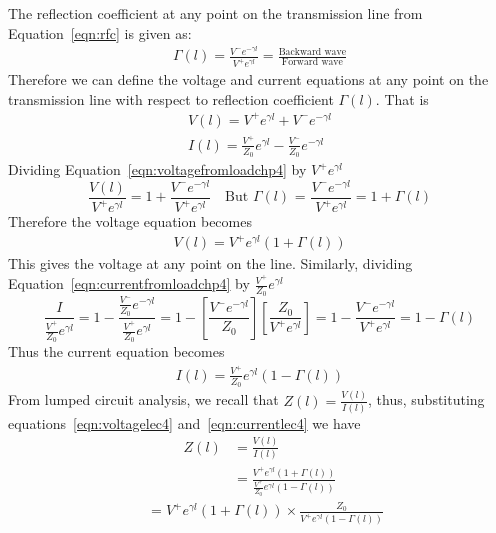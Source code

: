 The reflection coefficient at any point on the transmission line from Equation~\eqref{eqn:rfc} is given as:
\begin{align*}
\Gamma{(l)} = \frac{V^-e^{-\gamma l}}{V^+e^{\gamma l}} = \frac{\text{Backward wave}}{\text{Forward wave}}
\end{align*}
Therefore we can define the voltage and current equations at any point on the transmission line with respect to reflection coefficient $\Gamma(l)$. That is
\begin{align}
V(l) = V^+e^{\gamma l} + V^-e^{-\gamma l}\label{eqn:voltagefromloadchp4}\\
I(l) =\frac{V^+}{Z_0} e^{\gamma l} - \frac{V^-}{Z_0}e^{-\gamma l}\label{eqn:currentfromloadchp4}
\end{align}
Dividing Equation~\ref{eqn:voltagefromloadchp4} by $V^+e^{\gamma l}$
\begin{dmath*}
\frac{V(l)}{ V^+e^{\gamma l}} = 1 + \frac{ V^-e^{-\gamma l}}{ V^+e^{\gamma l}}\quad\text{But }\Gamma(l)\text{ = }\frac{ V^-e^{-\gamma l}}{ V^+e^{\gamma l}}
= 1 + \Gamma(l)
\end{dmath*}
Therefore the voltage equation becomes
\begin{align}
V(l) = V^+e^{\gamma l} (1 + \Gamma(l))
\label{eqn:voltagelec4}
\end{align}
This gives the voltage at any point on the line. Similarly, dividing Equation~\ref{eqn:currentfromloadchp4} by $\frac{V^+}{Z_0} e^{\gamma l}$
\begin{dmath*}
\frac{I}{\frac{V^+}{Z_0} e^{\gamma l}} = 1 - \frac{\frac{V^-}{Z_0} e^{-\gamma l}}{\frac{V^+}{Z_0} e^{\gamma l}}
= 1 - \left[\frac{V^-e^{-\gamma l}}{Z_0}\right]\left[\frac{Z_0}{V^+e^{\gamma l}}\right]
= 1 - \frac{V^-e^{-\gamma l}}{V^+e^{\gamma l}}
= 1 - \Gamma(l)
\end{dmath*}
Thus the current equation becomes
\begin{align}
I(l) = \frac{V^+}{Z_0} e^{\gamma l} (1 - \Gamma(l))
\label{eqn:currentlec4}
\end{align}
From lumped circuit analysis, we recall that $Z(l) = \frac{V(l)}{I(l)}$, thus, substituting equations~\eqref{eqn:voltagelec4} and~\eqref{eqn:currentlec4} we have
\begin{align*}
Z(l) &= \frac{V(l)}{I(l)}\\
&= \frac{V^+e^{\gamma l} (1 + \Gamma(l))}{ \frac{V^+}{Z_0} e^{\gamma l} (1 - \Gamma(l))}
\end{align*}
\begin{align*}
&= V^+e^{\gamma l}(1 + \Gamma(l)) \times \frac{Z_0}{V^+e^{\gamma l}(1 - \Gamma(l))}
\end{align*}
